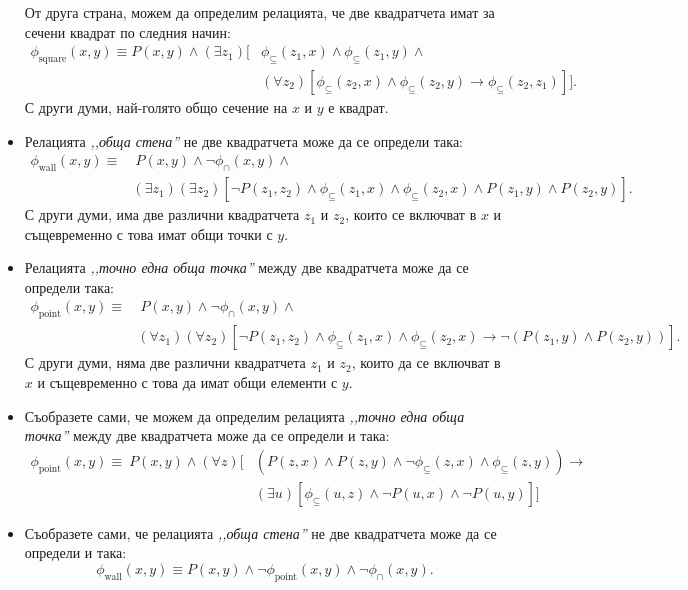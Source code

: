 \begin{example}
\begin{itemize}
    От друга страна, можем да определим релацията, че две квадратчета имат за сечени квадрат по следния начин:
    \begin{align*}
      \phi_{\text{square}}(x,y) \equiv P(x,y) \land (\exists z_1)[ & \phi_{\subseteq}(z_1,x) \land \phi_{\subseteq}(z_1,y) \land \\
                                                    & (\forall z_2)[\phi_{\subseteq}(z_2,x) \land \phi_{\subseteq}(z_2,y) \to \phi_{\subseteq}(z_2,z_1)]].
    \end{align*}
    С други думи, най-голято общо сечение на $x$ и $y$ е квадрат.
  \item
    Релацията \emph{,,обща стена''} не две квадратчета може да се определи така:
    \begin{align*}
      \phi_{\text{wall}}(x,y) \equiv & \ P(x,y) \land \neg \phi_{\cap}(x,y) \land\\
                                     & (\exists z_1)(\exists z_2)[\neg P(z_1,z_2) \land \phi_{\subseteq}(z_1,x) \land \phi_{\subseteq}(z_2,x) \land P(z_1,y)\land P(z_2,y)].
    \end{align*}
    С други думи, има две различни квадратчета $z_1$ и $z_2$, които се включват в $x$ и същевременно с това имат общи точки с $y$.
  \item
    Релацията \emph{,,точно една обща точка''} между две квадратчета може да се определи така:
    \begin{align*}
      \phi_{\text{point}}(x,y) \equiv & \ P(x,y) \land \neg \phi_{\cap}(x,y) \land\\
                                      & (\forall z_1)(\forall z_2)[\neg P(z_1,z_2) \land \phi_{\subseteq}(z_1,x) \land \phi_{\subseteq}(z_2,x) \to \neg(P(z_1,y)\land P(z_2,y))].
    \end{align*}
    С други думи, няма две различни квадратчета $z_1$ и $z_2$, които да се включват в $x$ и същевременно с това да имат общи елементи с $y$.
  \item
    Съобразете сами, че можем да определим релацията \emph{,,точно една обща точка''} между две квадратчета може да се определи и така:
    \begin{align*}
      \phi_{\text{point}}(x,y) \equiv \ P(x,y) \land (\forall z)[ & ( P(z,x) \land P(z,y) \land \neg \phi_{\subseteq}(z,x) \land \phi_{\subseteq}(z,y)) \to \\
                                                                  & (\exists u)[\phi_{\subseteq}(u,z) \land \neg P(u,x) \land \neg P(u,y)]] 
    \end{align*}
  \item
    Съобразете сами, че релацията \emph{,,обща стена''} не две квадратчета може да се определи и така:
    \[\phi_{\text{wall}}(x,y) \equiv P(x,y) \land \neg \phi_{\text{point}}(x,y) \land \neg \phi_{\cap}(x,y).\]
  \end{itemize}
\end{example}

